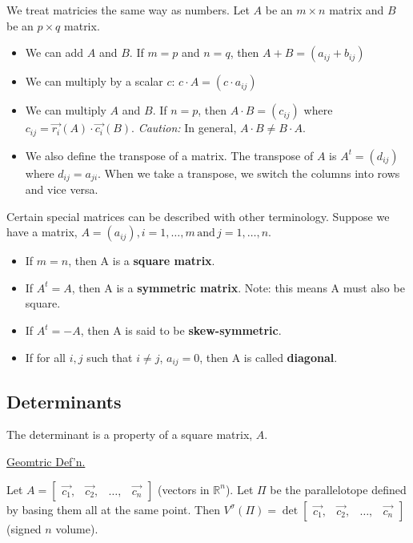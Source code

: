 \documentclass[../main.tex]{subfiles}
\begin{document}
We treat matricies the same way as numbers.
Let \( A \) be an \( m \times n \) matrix and \( B \) be an \( p \times q \) matrix.
\begin{itemize}[mode=unboxed]
    \item We can add \( A \) and \( B \). If \( m=p \) and \( n=q \), then \( A+B = ( a_{ij}+b_{ij} ) \)
    \item We can multiply by a scalar \( c \): \( c \cdot A = ( c \cdot a_{ij} ) \)
    \item We can multiply \( A \) and \( B \). If \( n=p \), then \( A \cdot B = (c_{ij}) \) where \( c_{ij} = \vec{r_{i}}(A) \cdot \vec{c_{i}}(B) \).
        \emph{Caution:} In general, \( A \cdot B \neq B \cdot A \).
    \item We also define the transpose of a matrix. The transpose of \( A \) is \( A^t = (d_{ij}) \) where \( d_{ij} = a_{ji} \).
        When we take a transpose, we switch the columns into rows and vice versa.
\end{itemize}

Certain special matrices can be described with other terminology.
Suppose we have a matrix, \( A = (a_{ij}), i = 1, \dots ,m \, \text{and} \, j = 1, \dots ,n \).
\begin{itemize}
    \item If \( m=n \), then A is a \textbf{square matrix}.
    \item If \( A^t = A \), then A is a \textbf{symmetric matrix}. Note: this means A must also be square.
    \item If \( A^t = -A \), then A is said to be \textbf{skew-symmetric}.
    \item If for all \( i,j \) such that \( i \neq j \), \( a_{ij} = 0 \), then A is called \textbf{diagonal}.
\end{itemize}

\subsection{Determinants}

The determinant is a property of a square matrix, \( A \).

\underline{Geomtric Def'n.}

Let \( A = \begin{bmatrix}
    \vec{c_1}, & \vec{c_2}, & \dots, & \vec{c_n}
\end{bmatrix} \)
(vectors in \( \mathbb{R}^n \)).
Let \( \Pi \) be the parallelotope defined by basing them all at the same point.
Then \( V^\sigma(\Pi) = \det \begin{bmatrix}
    \vec{c_1}, & \vec{c_2}, & \dots, & \vec{c_n}
\end{bmatrix} \) (signed \( n \) volume).
\end{document}
